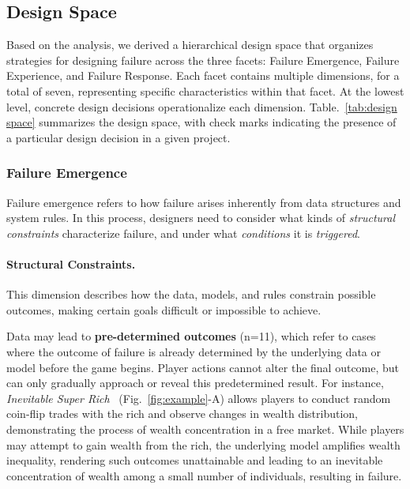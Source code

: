 \subsection{Design Space}

Based on the analysis, we derived a hierarchical design space that organizes strategies for designing failure across the three facets: Failure Emergence, Failure Experience, and Failure Response. Each facet contains multiple dimensions, for a total of seven, representing specific characteristics within that facet. At the lowest level, concrete design decisions operationalize each dimension. Table.~\ref{tab:design space} summarizes the design space, with check marks indicating the presence of a particular design decision in a given project.

\subsubsection{Failure Emergence}

Failure emergence refers to how failure arises inherently from data structures and system rules. In this process, designers need to consider what kinds of \textit{structural constraints} characterize failure, and under what \textit{conditions} it is \textit{triggered}.

\paragraph{Structural Constraints.}
This dimension describes how the data, models, and rules constrain possible outcomes, making certain goals difficult or impossible to achieve.

Data may lead to \textbf{pre-determined outcomes} (n=11), which refer to cases where the outcome of failure is already determined by the underlying data or model before the game begins. Player actions cannot alter the final outcome, but can only gradually approach or reveal this predetermined result. For instance, \textit{Inevitable Super Rich}~\cite{InevitableSuperRich} (Fig.~\ref{fig:example}-A) allows players to conduct random coin-flip trades with the rich and observe changes in wealth distribution, demonstrating the process of wealth concentration in a free market. While players may attempt to gain wealth from the rich, the underlying model amplifies wealth inequality, rendering such outcomes unattainable and leading to an inevitable concentration of wealth among a small number of individuals, resulting in failure.


